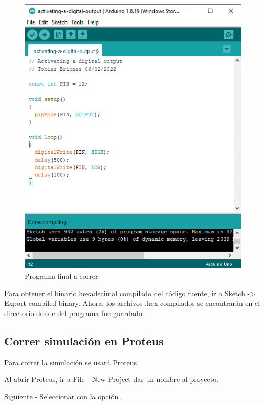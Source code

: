 \documentclass{article}
\begin{document}
\begin{figure}[H]
    \centering
    \includegraphics[width=0.5\paperwidth]{images/arduino-2.png}
    \caption{Programa final a correr}
\end{figure}

Para obtener el binario hexadecimal compilado del código fuente, ir a Sketch -> Export compiled binary. 
Ahora, los archivos .hex compilados se encontrarán en el directorio donde del programa fue guardado.

\subsection{Correr simulación en Proteus}

Para correr la simulación se usará Proteus.

\bigbreak

Al abrir Proteus, ir a File - New Project dar un nombre al proyecto.

\bigbreak

Siguiente - Seleccionar  con la opción .
\end{document}
